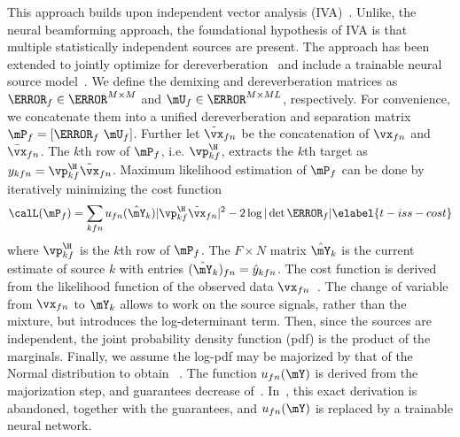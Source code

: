 \documentclass[a4paper]{article}
\begin{document}
This approach builds upon independent vector analysis (IVA)~\cite{kimIndependentVectorAnalysis2006a,hiroeSolutionPermutationProblem2006}.
Unlike, the neural beamforming approach, the foundational hypothesis of IVA is that multiple statistically independent sources are present.
The approach has been extended to jointly optimize for dereverberation~\cite{ilrma-t,nakashimaJointDereverberationSeparation2021} and include a trainable neural source model~\cite{scheiblerSurrogateSourceModel2021,saijo_tiss_2021}.
We define the demixing and dereverberation matrices as $\mW_f \in \C^{M\times M}$ and $\mU_f\in \C^{M \times ML}$, respectively.
For convenience, we concatenate them into a unified dereverberation and separation matrix $\mP_f = [\mW_f\ \mU_f]$.
Further let $\tilde{\vx}_{fn}$ be the concatenation of $\vx_{fn}$ and $\bar{\vx}_{fn}$.
The $k$th row of $\mP_f$, i.e. $\vp_{kf}^\H$, extracts the $k$th target as $y_{kfn} = \vp_{kf}^\H \tilde{\vx}_{fn}$.
Maximum likelihood estimation of $\mP_f$ can be done by iteratively minimizing the cost function
\begin{multline}
  \calL(\mP_f) =  \sum_{kfn} u_{fn}(\hat{\mY}_k) | \vp_{kf}^\H \tilde{\vx}_{fn} |^2 - 2\log |\det \mW_f| 
  \elabel{t-iss-cost}
\end{multline}
where $\vp_{kf}^\H$ is the $k$th row of $\mP_f$.
The $F\times N$ matrix $\hat{\mY}_k$ is the current estimate of source $k$ with entries $(\hat{\mY}_k)_{fn} = \hat{y}_{kfn}$.
The cost function  is derived from the likelihood function of the observed data $\vx_{fn}$~\cite{ilrma-t}.
The change of variable from $\vx_{fn}$ to $\mY_k$ allows to work on the source signals, rather than the mixture, but introduces the log-determinant term.
Then, since the sources are independent, the joint probability density function (pdf) is the product of the marginals.
Finally, we assume the log-pdf may be majorized by that of the Normal distribution to obtain ~\cite{onoStableFastUpdate2011}.
The function $u_{fn}(\mY)$ is derived from the majorization step, and guarantees decrease of~.
In~\cite{scheiblerSurrogateSourceModel2021,saijo_tiss_2021}, this exact derivation is abandoned, together with the guarantees, and $u_{fn}(\mY)$ is replaced by a trainable neural network.
\end{document}
